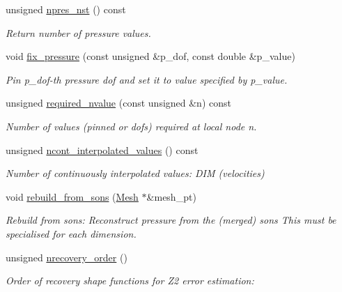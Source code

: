 \begin{DoxyCompactItemize}
unsigned \hyperlink{classoomph_1_1PRefineableQCrouzeixRaviartElement_a6431bb5f74022a94d074d04ba2f4c7a1}{npres\+\_\+nst} () const
\begin{DoxyCompactList}\small\item\em Return number of pressure values. \end{DoxyCompactList}\item 
void \hyperlink{classoomph_1_1PRefineableQCrouzeixRaviartElement_a31a014a5e5d549d793968245d56d5d69}{fix\+\_\+pressure} (const unsigned \&p\+\_\+dof, const double \&p\+\_\+value)
\begin{DoxyCompactList}\small\item\em Pin p\+\_\+dof-\/th pressure dof and set it to value specified by p\+\_\+value. \end{DoxyCompactList}\item 
unsigned \hyperlink{classoomph_1_1PRefineableQCrouzeixRaviartElement_a5789a5ace7a5d633dec82c775ac890bf}{required\+\_\+nvalue} (const unsigned \&n) const
\begin{DoxyCompactList}\small\item\em Number of values (pinned or dofs) required at local node n. \end{DoxyCompactList}\item 
unsigned \hyperlink{classoomph_1_1PRefineableQCrouzeixRaviartElement_a8fc2388f81c74e6c9dc32058592ed7d2}{ncont\+\_\+interpolated\+\_\+values} () const
\begin{DoxyCompactList}\small\item\em Number of continuously interpolated values\+: D\+IM (velocities) \end{DoxyCompactList}\item 
void \hyperlink{classoomph_1_1PRefineableQCrouzeixRaviartElement_a0511e9fbba31ef30acd3cf7987d1f4a5}{rebuild\+\_\+from\+\_\+sons} (\hyperlink{classoomph_1_1Mesh}{Mesh} $\ast$\&mesh\+\_\+pt)
\begin{DoxyCompactList}\small\item\em Rebuild from sons\+: Reconstruct pressure from the (merged) sons This must be specialised for each dimension. \end{DoxyCompactList}\item 
unsigned \hyperlink{classoomph_1_1PRefineableQCrouzeixRaviartElement_a8a4bf8ba2d89273431c78ea5e09e0947}{nrecovery\+\_\+order} ()
\begin{DoxyCompactList}\small\item\em Order of recovery shape functions for Z2 error estimation\+: \end{DoxyCompactList}\item 

\end{DoxyCompactItemize}
